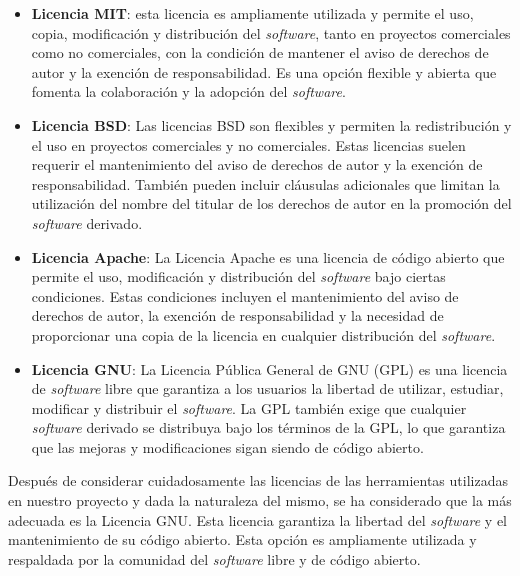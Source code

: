\begin{itemize}
    \item \textbf{Licencia MIT}: esta licencia es ampliamente utilizada y permite el uso, copia, modificación y distribución del \textit{software}, tanto en proyectos comerciales como no comerciales, con la condición de mantener el aviso de derechos de autor y la exención de responsabilidad. Es una opción flexible y abierta que fomenta la colaboración y la adopción del \textit{software}.

    \item \textbf{Licencia BSD}: Las licencias BSD son flexibles y permiten la redistribución y el uso en proyectos comerciales y no comerciales. Estas licencias suelen requerir el mantenimiento del aviso de derechos de autor y la exención de responsabilidad. También pueden incluir cláusulas adicionales que limitan la utilización del nombre del titular de los derechos de autor en la promoción del \textit{software} derivado.

    \item \textbf{Licencia Apache}: La Licencia Apache es una licencia de código abierto que permite el uso, modificación y distribución del \textit{software} bajo ciertas condiciones. Estas condiciones incluyen el mantenimiento del aviso de derechos de autor, la exención de responsabilidad y la necesidad de proporcionar una copia de la licencia en cualquier distribución del \textit{software}.

    \item \textbf{Licencia GNU}: La Licencia Pública General de GNU (GPL) es una licencia de \textit{software} libre que garantiza a los usuarios la libertad de utilizar, estudiar, modificar y distribuir el \textit{software}. La GPL también exige que cualquier \textit{software} derivado se distribuya bajo los términos de la GPL, lo que garantiza que las mejoras y modificaciones sigan siendo de código abierto.

\end{itemize}

Después de considerar cuidadosamente las licencias de las herramientas utilizadas en nuestro proyecto y dada la naturaleza del mismo, se ha considerado que la más adecuada es la Licencia GNU. Esta licencia garantiza la libertad del \textit{software} y el mantenimiento de su código abierto. Esta opción es ampliamente utilizada y respaldada por la comunidad del \textit{software} libre y de código abierto.

